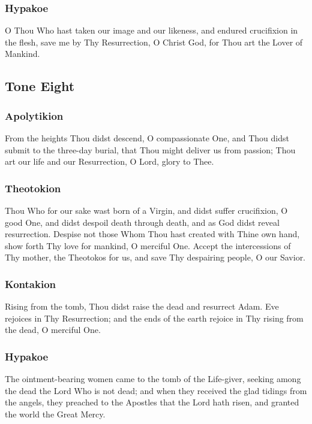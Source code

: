 \subsubsection{Hypakoe}

O Thou Who hast taken our image and our likeness, and endured crucifixion in the flesh, save me by Thy Resurrection, O Christ God, for Thou art the Lover of Mankind.

\subsection{Tone Eight}

\subsubsection{Apolytikion}

From the heights Thou didst descend, O compassionate One, and Thou didst submit to the three-day burial, that Thou might deliver us from passion; Thou art our life and our Resurrection, O Lord, glory to Thee.

\subsubsection{Theotokion}

Thou Who for our sake wast born of a Virgin, and didst suffer crucifixion, O good One, and didst despoil death through death, and as God didst reveal resurrection. Despise not those Whom Thou hast created with Thine own hand, show forth Thy love for mankind, O merciful One. Accept the intercessions of Thy mother, the Theotokos for us, and save Thy despairing people, O our Savior.

\subsubsection{Kontakion}

Rising from the tomb, Thou didst raise the dead and resurrect Adam. Eve rejoices in Thy Resurrection; and the ends of the earth rejoice in Thy rising from the dead, O merciful One.

\subsubsection{Hypakoe}

The ointment-bearing women came to the tomb of the Life-giver, seeking among the dead the Lord Who is not dead; and when they received the glad tidings from the angels, they preached to the Apostles that the Lord hath risen, and granted the world the Great Mercy.

\cleardoublepage
